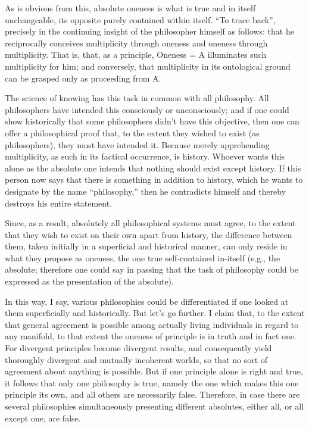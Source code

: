 As is obvious from this, absolute oneness is
what is true and in itself unchangeable,
its opposite purely contained within itself.
“To trace back”, precisely in the continuing insight of
the philosopher himself as follows:
that he reciprocally conceives multiplicity through oneness
and oneness through multiplicity.
That is, that, as a principle, Oneness = A illuminates
such multiplicity for him;
and conversely, that multiplicity in its ontological ground can
be grasped only as proceeding from A.

The science of knowing has this task in common with all philosophy.
All philosophers have intended this consciously or unconsciously;
and if one could show historically that some philosophers
didn't have this objective,
then one can offer a philosophical proof that,
to the extent they wished to exist (as philosophers),
they must have intended it.
Because merely apprehending multiplicity,
as such in its factical occurrence, is history.
Whoever wants this alone as the absolute one
intends that nothing should exist except history.
If this person now says that there is something in addition to history,
which he wants to designate by the name “philosophy,”
then he contradicts himself and thereby destroys his entire statement.

Since, as a result, absolutely all philosophical systems must agree,
to the extent that they wish to exist on their own apart from history,
the difference between them, taken initially in a superficial and
historical manner, can only reside in what they propose as oneness,
the one true self-contained in-itself
(e.g., the absolute; therefore one could say in passing that
the task of philosophy could be expressed as
the presentation of the absolute).

In this way, I say, various philosophies could be differentiated
if one looked at them superficially and historically.
But let's go further.
I claim that, to the extent that general agreement is possible
among actually living individuals in regard to any manifold,
to that extent the oneness of principle is in truth and in fact one.
For divergent principles become divergent results,
and consequently yield thoroughly divergent and mutually incoherent worlds,
so that no sort of agreement about anything is possible.
But if one principle alone is right and true,
it follows that only one philosophy is true,
namely the one which makes this one principle its own,
and all others are necessarily false.
Therefore, in case there are several philosophies simultaneously presenting
different absolutes, either all, or all except one, are false.

